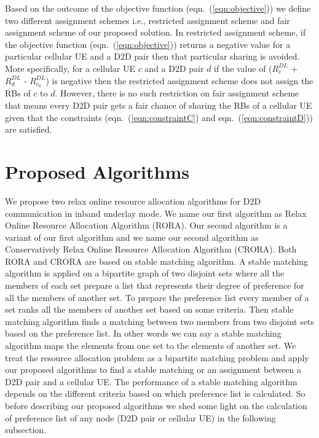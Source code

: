 \documentclass[times]{dacauth}
\begin{document}
\noindent
Based on the outcome of the objective function (eqn.~(\ref{eqn:objective})) we define two different assignment schemes i.e., restricted assignment scheme and fair assignment scheme of our proposed solution. In restricted assignment scheme, if the objective function (eqn.~(\ref{eqn:objective})) returns a negative value for a particular cellular UE and a D2D pair then that particular sharing is avoided. More specifically, for a cellular UE $c$ and a D2D pair $d$ if the value of ($R_{c}^{DL}$ + $R_{d}^{DL}$ - $R_{c_0}^{DL}$) is negative then the restricted assignment scheme does not assign the RBs of $c$ to $d$. However, there is no such restriction on fair assignment scheme that means every D2D pair gets a fair chance of sharing the RBs of a cellular UE given that the constraints (eqn.~(\ref{eqn:constraintC}) and eqn.~(\ref{eqn:constraintD})) are satisfied.



\section{Proposed Algorithms}\label{section:Proposed Algorithm}

\noindent
We propose two relax online resource allocation algorithms for D2D communication in inband underlay mode. We name our first algorithm as Relax Online Resource Allocation Algorithm (RORA). Our second algorithm is a variant of our first algorithm and we name our second algorithm as Conservatively Relax Online Resource Allocation Algorithm (CRORA). Both RORA and CRORA are based on stable matching algorithm\cite{knuth1976mariages}. A stable matching algorithm is applied on a bipartite graph of two disjoint sets where all the members of each set prepare a list that represents their degree of preference for all the members of another set. To prepare the preference list every member of a set ranks all the members of another set based on some criteria. Then stable matching algorithm finds a matching between two members from two disjoint sets based on the preference list. In other words we can say a stable matching algorithm maps the elements from one set to the elements of another set. We treat the resource allocation problem as a bipartite matching problem and apply our proposed algorithms to find a stable matching or an assignment between a D2D pair and a cellular UE. The performance of a stable matching algorithm depends on the different criteria based on which preference list is calculated. So before describing our proposed algorithms we shed some light on the calculation of preference list of any node (D2D pair or cellular UE) in the following subsection.  
\end{document}
